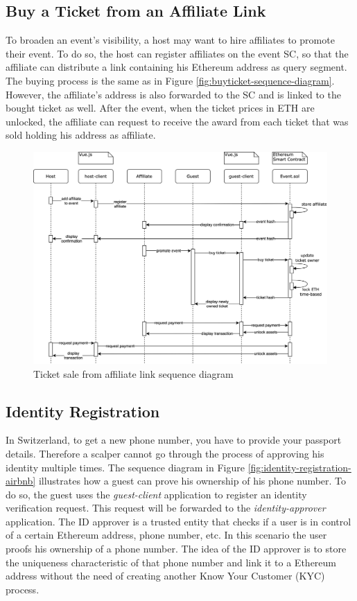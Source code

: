 \subsection{Buy a Ticket from an Affiliate Link}
To broaden an event's visibility, a host may want to hire affiliates to promote their event. To do so, the host can register affiliates on the event SC, so that the affiliate can distribute a link containing his Ethereum address as query segment. The buying process is the same as in Figure \ref{fig:buyticket-sequence-diagram}. However, the affiliate's address is also forwarded to the SC and is linked to the bought ticket as well. After the event, when the ticket prices in ETH are unlocked, the affiliate can request to receive the award from each ticket that was sold holding his address as affiliate.
\begin{figure}[H]
    \centering
    \includegraphics[width=16cm]{design/diagrams/BuyTicketFromAffiliateLink.png}
    \caption{Ticket sale from affiliate link sequence diagram}
    \label{fig:buyticket-from-affiliate-diagram}
\end{figure}

\subsection{Identity Registration}
In Switzerland, to get a new phone number, you have to provide your passport details. Therefore a scalper cannot go through the process of approving his identity multiple times. The sequence diagram in Figure \ref{fig:identity-registration-airbnb} illustrates how a guest can prove his ownership of his phone number. To do so, the guest uses the \textit{guest-client} application to register an identity verification request. This request will be forwarded to the \textit{identity-approver} application. The ID approver is a trusted entity that checks if a user is in control of a certain Ethereum address, phone number, etc. In this scenario the user proofs his ownership of a phone number.  The idea of the ID approver is to store the uniqueness characteristic of that phone number and link it to a Ethereum address without the need of creating another Know Your Customer (KYC) process.

